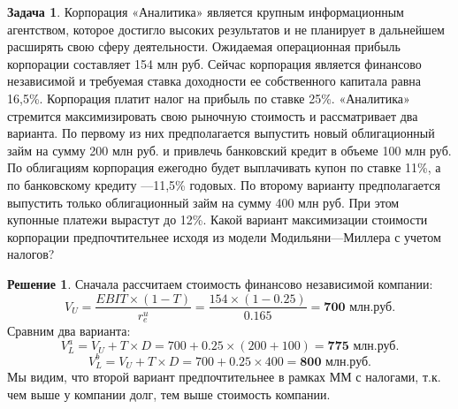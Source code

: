\documentclass[a4paper, 14pt]{article}
\theoremstyle{plain} %
\theoremstyle{definition} %
\newtheorem*{solution}{Решение}
\newtheorem{problem}{Задача}[subsection]
\theoremstyle{remark} %
\begin{document}
\begin{problem}
	Корпорация «Аналитика» является крупным информационным агентством, которое достигло высоких результатов и не планирует в дальнейшем расширять свою сферу деятельности. Ожидаемая операционная прибыль корпорации составляет 154 млн руб. Сейчас корпорация является финансово независимой и требуемая ставка доходности ее собственного капитала равна 16,5\%. Корпорация платит налог на прибыль по ставке 25\%. «Аналитика» стремится максимизировать свою рыночную стоимость и рассматривает два варианта. По первому из них предполагается выпустить новый облигационный займ на сумму 200 млн руб. и привлечь банковский кредит в объеме 100 млн руб. По облигациям корпорация ежегодно будет выплачивать купон по ставке 11\%, а по банковскому кредиту —11,5\% годовых. По второму варианту предполагается выпустить только облигационный займ на сумму 400 млн руб. При этом купонные платежи вырастут до 12\%. Какой вариант максимизации стоимости корпорации предпочтительнее исходя из модели Модильяни—Миллера с учетом налогов?
	\begin{solution}
		Сначала рассчитаем стоимость финансово независимой компании:
		\[
			V_U = \frac{EBIT \times (1-T)}{r_e^u} = \frac{154 \times (1-0.25)}{0.165} = \textbf{700 млн.руб.}
		\]
		Сравним два варианта:
		\[
			V_L^a = V_U + T\times D = 700 + 0.25\times (200+100) = \textbf{775 млн.руб.}
		\]
		\[
			V_L^b = V_U + T\times D = 700 + 0.25\times 400 = \textbf{800 млн.руб.}
		\]
		Мы видим, что второй вариант предпочтительнее в рамках ММ с налогами, т.к. чем выше у компании долг, тем выше стоимость компании.
	\end{solution}
\end{problem}
\end{document}
